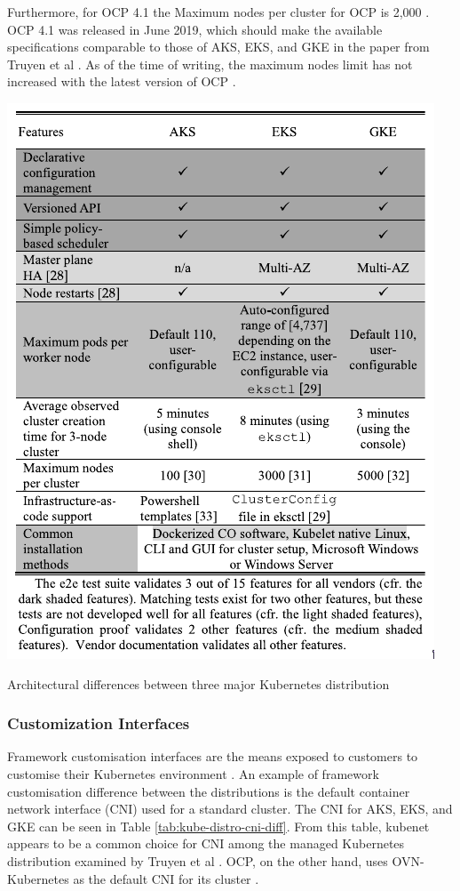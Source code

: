 Furthermore, for OCP 4.1 the Maximum nodes per cluster for OCP is 2,000 \cite{Chapter6Planning}. OCP 4.1 was released in June 2019, which should make the available specifications comparable to those of AKS, EKS, and GKE in the paper from Truyen et al \cite{truyenManagingFeatureCompatibility2020}. As of the time of writing, the maximum nodes limit has not increased with the latest version of OCP \cite{Chapter4Planning}.


\begin{table}
    \centering
    \includegraphics[width=0.6\linewidth]{resources/Pasted image 20241123075148.png}
    \caption{Architectural differences between three major Kubernetes distribution \cite{truyenManagingFeatureCompatibility2020}}
    \label{tab:architecture-diff-k8s-distro}
\end{table}

\FloatBarrier



\subsubsection{Customization Interfaces}



Framework customisation interfaces are the means exposed to customers to customise their Kubernetes environment \cite{truyenManagingFeatureCompatibility2020}. An example of framework customisation difference between the distributions is the default container network interface (CNI) used for a standard cluster. The CNI for AKS, EKS, and GKE can be seen in Table \ref{tab:kube-distro-cni-diff}. From this table, kubenet appears to be a common choice for CNI among the managed Kubernetes distribution examined by Truyen et al \cite{truyenManagingFeatureCompatibility2020}. OCP, on the other hand, uses OVN-Kubernetes as the default CNI for its cluster \cite{Chapter23OVNKubernetes}.


